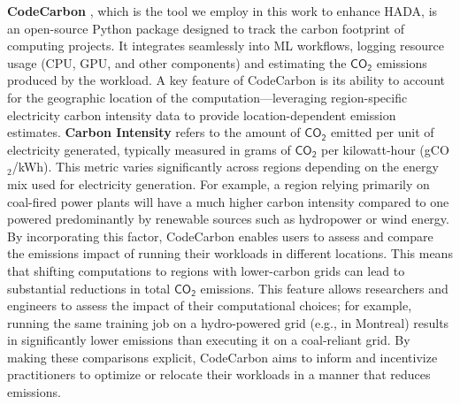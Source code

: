 \documentclass[a4paper,singleside,12pt]{report} %
\begin{document}
\textbf{CodeCarbon} \cite{courty2024codecarbon}, which is the tool we employ in this work to enhance HADA, is an open-source 
Python package designed to track the carbon footprint of computing projects. It integrates seamlessly into ML workflows, 
logging resource usage (CPU, GPU, and other components) and estimating the $\mathsf{CO_2}$ emissions produced by the workload. 
A key feature of CodeCarbon is its ability to account for the geographic location of the computation—leveraging region-specific 
electricity carbon intensity data to provide location-dependent emission estimates. \textbf{Carbon Intensity} refers to the 
amount of $\mathsf{CO_2}$ emitted per unit of electricity generated, typically measured in grams of $\mathsf{CO_2}$ per 
kilowatt-hour (gCO$_2$/kWh). This metric varies significantly across regions depending on the energy mix used for electricity 
generation. For example, a region relying primarily on coal-fired power plants will have a much higher carbon intensity compared 
to one powered predominantly by renewable sources such as hydropower or wind energy. By incorporating this factor, CodeCarbon 
enables users to assess and compare the emissions impact of running their workloads in different locations. This means that 
shifting computations to regions with lower-carbon grids can lead to substantial reductions in total $\mathsf{CO_2}$ emissions.
This feature allows researchers and engineers to assess the impact of their computational choices; for example, running the same 
training job on a hydro-powered grid (e.g., in Montreal) results in significantly lower emissions than executing it on a 
coal-reliant grid. By making these comparisons explicit, CodeCarbon aims to inform and incentivize practitioners to optimize or 
relocate their workloads in a manner that reduces emissions.
\end{document}

